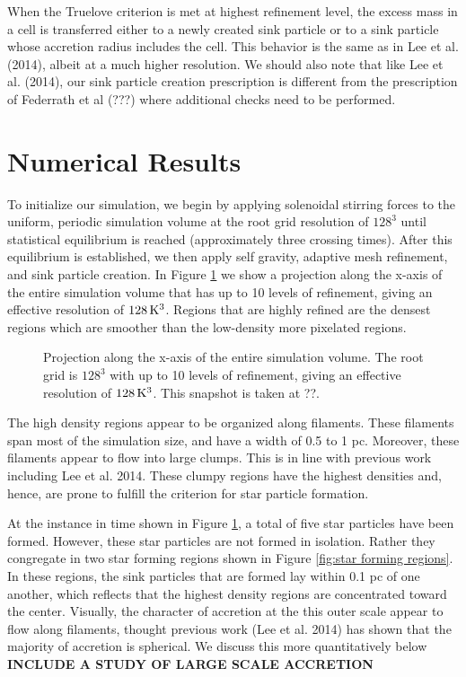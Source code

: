 \documentclass{emulateapj}
\begin{document}
When the Truelove criterion is met at highest refinement level, the excess mass in a cell is transferred either to a newly created sink particle or to a sink particle whose accretion radius includes the cell.  This behavior is the same as in Lee et al. (2014), albeit at a much higher resolution.  We should also note that like Lee et al. (2014), our sink particle creation prescription is different from the prescription of Federrath et al (???) where additional checks need to be performed.


\section{Numerical Results}

To initialize our simulation, we begin by applying solenoidal stirring forces to the uniform, periodic simulation volume at the root grid resolution of $128^3$ until statistical equilibrium is reached (approximately three crossing times).  After this equilibrium is established, we then apply self gravity, adaptive mesh refinement, and sink particle creation.  In Figure \ref{fig:entire projection} we show a projection along the x-axis of the entire simulation volume that has up to 10 levels of refinement, giving an effective resolution of $128\,{\rm K}^3$. Regions that are highly refined are the densest regions which are smoother than the low-density more pixelated regions.
\begin{figure}
\caption{Projection along the x-axis of the entire simulation volume. The root grid is $128^3$ with up to 10 levels of refinement, giving an effective resolution of $128\,{\rm K}^3$. This snapshot is taken at ??. \label{fig:entire projection}}
\end{figure}

The high density regions appear to be organized along filaments.  These filaments span most of the simulation size, and have a width of 0.5 to 1 pc.  Moreover, these filaments appear to flow into large clumps.  This is in line with previous work including Lee et al. 2014. These clumpy regions have the highest densities and, hence, are prone to fulfill the criterion for star particle formation.  

At the instance in time shown in Figure \ref{fig:entire projection}, a total of five star particles have been formed.  However, these star particles are not formed in isolation.  Rather they congregate in two star forming regions shown in Figure \ref{fig:star forming regions}.  In these regions, the sink particles that are formed lay within 0.1 pc of one another, which reflects that the highest density regions are concentrated toward the center.  Visually, the character of accretion at the this outer scale appear to flow along filaments, thought previous work (Lee et al. 2014) has shown that the majority of accretion is spherical.  We discuss this more quantitatively below {\bf INCLUDE A STUDY OF LARGE SCALE ACCRETION}
\end{document}
